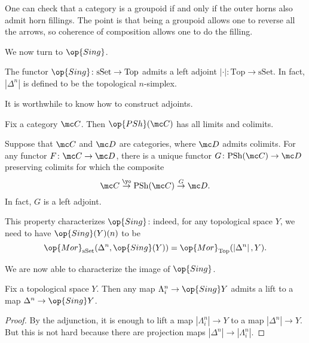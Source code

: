 \documentclass[../notes.tex]{subfiles}
\begin{document}
\begin{remark} \label{rem:groupoid-is-kan}
	One can check that a category is a groupoid if and only if the outer horns also admit horn fillings. The point is that being a groupoid allows one to reverse all the arrows, so coherence of composition allows one to do the filling.
\end{remark}
We now turn to $\op{Sing}$.
\begin{proposition}
	The functor $\op{Sing}\colon\mathrm{sSet}\to\mathrm{Top}$ admits a left adjoint $\left|\cdot\right|\colon\mathrm{Top}\to\mathrm{sSet}$. In fact, $\left|\Delta^n\right|$ is defined to be the topological $n$-simplex.
\end{proposition}
It is worthwhile to know how to construct adjoints.
\begin{theorem}
	Fix a category $\mc C$. Then $\op{PSh}(\mc C)$ has all limits and colimits.
\end{theorem}
\begin{theorem}
	Suppose that $\mc C$ and $\mc D$ are categories, where $\mc D$ admits colimits. For any functor $F\colon\mc C\to\mc D$, there is a unique functor $G\colon\mathrm{PSh}(\mc C)\to\mc D$ preserving colimits for which the composite
	\[\mc C\stackrel{\yo}\to\mathrm{PSh}(\mc C)\stackrel G\to\mc D.\]
	In fact, $G$ is a left adjoint.
\end{theorem}
\begin{remark}
	This property characterizes $\op{Sing}$: indeed, for any topological space $Y$, we need to have $\op{Sing}(Y)(n)$ to be
	\[\op{Mor}_{\mathrm{sSet}}(\Delta^n,\op{Sing}(Y))=\op{Mor}_{\mathrm{Top}}(\left|\Delta^n\right|,Y).\]
\end{remark}
We are now able to characterize the image of $\op{Sing}$.
\begin{proposition} \label{prop:sing-is-kan}
	Fix a topological space $Y$. Then any map $\Lambda_i^n\to\op{Sing}Y$ admits a lift to a map $\Delta^n\to\op{Sing}Y$.
\end{proposition}
\begin{proof}
	By the adjunction, it is enough to lift a map $\left|\Lambda_i^n\right|\to Y$ to a map $\left|\Delta^n\right|\to Y$. But this is not hard because there are projection maps $\left|\Delta^n\right|\to\left|\Lambda_i^n\right|$.
\end{proof}
\end{document}
